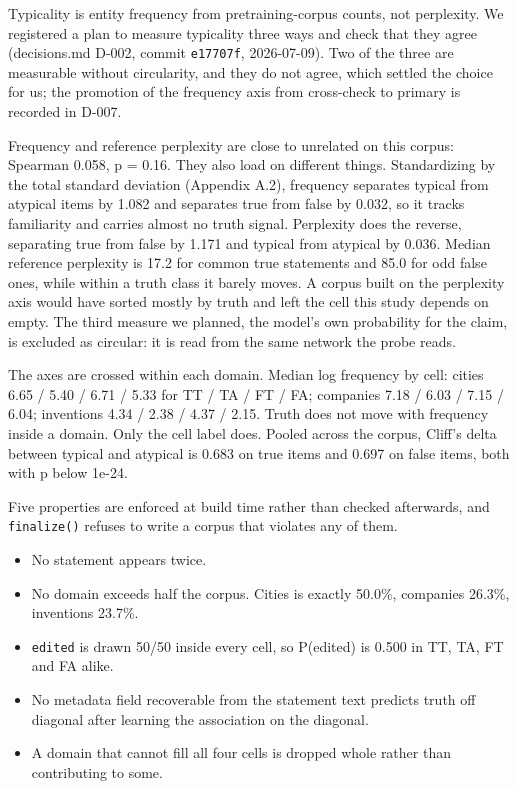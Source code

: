 \documentclass[10pt]{article}
\begin{document}
Typicality is entity frequency from pretraining-corpus counts, not perplexity. We registered a plan to measure typicality three ways and check that they agree (decisions.md D-002, commit \texttt{e17707f}, 2026-07-09). Two of the three are measurable without circularity, and they do not agree, which settled the choice for us; the promotion of the frequency axis from cross-check to primary is recorded in D-007.

Frequency and reference perplexity are close to unrelated on this corpus: Spearman 0.058, p = 0.16. They also load on different things. Standardizing by the total standard deviation (Appendix A.2), frequency separates typical from atypical items by 1.082 and separates true from false by 0.032, so it tracks familiarity and carries almost no truth signal. Perplexity does the reverse, separating true from false by 1.171 and typical from atypical by 0.036. Median reference perplexity is 17.2 for common true statements and 85.0 for odd false ones, while within a truth class it barely moves. A corpus built on the perplexity axis would have sorted mostly by truth and left the cell this study depends on empty. The third measure we planned, the model's own probability for the claim, is excluded as circular: it is read from the same network the probe reads.

The axes are crossed within each domain. Median log frequency by cell: cities 6.65 / 5.40 / 6.71 / 5.33 for TT / TA / FT / FA; companies 7.18 / 6.03 / 7.15 / 6.04; inventions 4.34 / 2.38 / 4.37 / 2.15. Truth does not move with frequency inside a domain. Only the cell label does. Pooled across the corpus, Cliff's delta between typical and atypical is 0.683 on true items and 0.697 on false items, both with p below 1e-24.

Five properties are enforced at build time rather than checked afterwards, and \texttt{finalize()} refuses to write a corpus that violates any of them.

\begin{itemize}
\item No statement appears twice.
\item No domain exceeds half the corpus. Cities is exactly 50.0\%, companies 26.3\%, inventions 23.7\%.
\item \texttt{edited} is drawn 50/50 inside every cell, so P(edited) is 0.500 in TT, TA, FT and FA alike.
\item No metadata field recoverable from the statement text predicts truth off diagonal after learning the association on the diagonal.
\item A domain that cannot fill all four cells is dropped whole rather than contributing to some.
\end{itemize}
\end{document}

